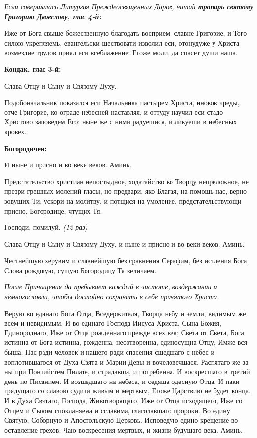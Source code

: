 \itshape Если совершалась Литургия Преждеосвященных Даров, читай \bfseries тропарь святому Григорию Двоеслову, глас 4-й:\normalfont{}\normalfont{}


Иже от Бога свыше божественную благодать восприем, славне Григорие, и Того силою укрепляемь, евангельски шествовати изволил еси, отонудуже у Христа возмездие трудов приял еси всеблаженне: Егоже моли, да спасет души наша.  




\bfseries Кондак, глас 3-й:\normalfont{}


Слава Отцу и Сыну и Святому Духу.


Подобоначальник показался еси Начальника пастырем Христа, иноков чреды, отче Григорие, ко ограде небесней наставляя, и оттуду научил еси стадо Христово заповедем Его: ныне же с ними радуешися, и ликуеши в небесных кровех.




\bfseries Богородичен:\normalfont{}


И ныне и присно и во веки веков. Аминь.


Предстательство христиан непостыдное, ходатайство ко Творцу непреложное, не презри грешных молений гласы, но предвари, яко Благая, на помощь нас, верно зовущих Ти: ускори на молитву, и потщися на умоление, предстательствующи присно, Богородице, чтущих Тя.


Господи, помилуй. \itshape (12 раз)\normalfont{}


Слава Отцу и Сыну и Святому Духу, и ныне и присно и во веки веков. Аминь.


Честнейшую херувим и славнейшую без сравнения Серафим, без истления Бога Слова рождшую, сущую Богородицу Тя величаем. 


\itshape После Причащения да пребывает каждый в чистоте, воздержании и немногословии, чтобы достойно сохранить в себе принятого Христа.\normalfont{}


\mychapterending

 


Верую во единаго Бога Отца, Вседержителя, Творца небу и земли, видимым же всем и невидимым. И во единаго Господа Иисуса Христа, Сына Божия, Единороднаго, Иже от Отца рожденнаго прежде всех век; Света от Света, Бога истинна от Бога истинна, рожденна, несотворенна, единосущна Отцу, Имже вся быша. Нас ради человек и нашего ради спасения сшедшаго с небес и воплотившагося от Духа Свята и Марии Девы и вочеловечшася. Распятаго же за ны при Понтийстем Пилате, и страдавша, и погребенна. И воскресшаго в третий день по Писанием. И возшедшаго на небеса, и седяща одесную Отца. И паки грядущаго со славою судити живым и мертвым, Егоже Царствию не будет конца. И в Духа Святаго, Господа, Животворящаго, Иже от Отца исходящего, Иже со Отцем и Сыном спокланяема и сславима, глаголавшаго пророки. Во едину Святую, Соборную и Апостольскую Церковь. Исповедую едино крещение во оставление грехов. Чаю воскресения мертвых, и жизни будущаго века. Аминь.


\mychapterending